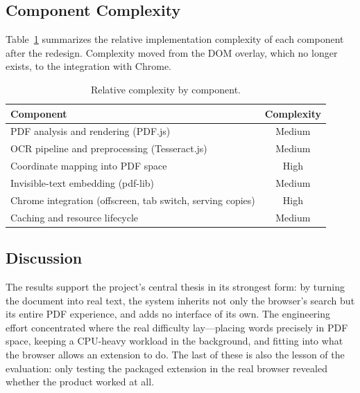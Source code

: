 \subsection{Component Complexity}
Table~\ref{tab:scope} summarizes the relative implementation complexity of each
component after the redesign. Complexity moved from the DOM overlay, which no
longer exists, to the integration with Chrome.

\begin{table}[ht]
  \centering
  \caption{Relative complexity by component.}
  \label{tab:scope}
  \renewcommand{\arraystretch}{1.25}
  \begin{tabular}{@{}lc@{}}
    \toprule
    \textbf{Component} & \textbf{Complexity} \\
    \midrule
    PDF analysis and rendering (PDF.js)            & Medium \\
    OCR pipeline and preprocessing (Tesseract.js)  & Medium \\
    Coordinate mapping into PDF space              & High \\
    Invisible-text embedding (pdf-lib)             & Medium \\
    Chrome integration (offscreen, tab switch, serving copies) & High \\
    Caching and resource lifecycle                 & Medium \\
    \bottomrule
  \end{tabular}
\end{table}

\subsection{Discussion}
The results support the project's central thesis in its strongest form: by
turning the document into real text, the system inherits not only the browser's
search but its entire PDF experience, and adds no interface of its own. The
engineering effort concentrated where the real difficulty lay---placing words
precisely in PDF space, keeping a CPU-heavy workload in the background, and
fitting into what the browser allows an extension to do. The last of these is
also the lesson of the evaluation: only testing the packaged extension in the
real browser revealed whether the product worked at all.
